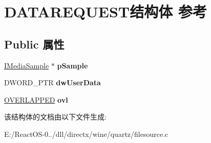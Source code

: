 \hypertarget{struct_d_a_t_a_r_e_q_u_e_s_t}{}\section{D\+A\+T\+A\+R\+E\+Q\+U\+E\+S\+T结构体 参考}
\label{struct_d_a_t_a_r_e_q_u_e_s_t}
\subsection*{Public 属性}
\begin{DoxyCompactItemize}
\item 
\mbox{\label{struct_d_a_t_a_r_e_q_u_e_s_t_ac9af028a17b797e496bcdaf2244c1789}} 
\hyperlink{interface_i_media_sample}{I\+Media\+Sample} $\ast$ {\bfseries p\+Sample}
\item 
\mbox{\label{struct_d_a_t_a_r_e_q_u_e_s_t_abb4e50a3109320747de2970bf762aca4}} 
D\+W\+O\+R\+D\+\_\+\+P\+TR {\bfseries dw\+User\+Data}
\item 
\mbox{\label{struct_d_a_t_a_r_e_q_u_e_s_t_a5653d18bf06a346ef6c92cf818a000d6}} 
\hyperlink{struct___o_v_e_r_l_a_p_p_e_d}{O\+V\+E\+R\+L\+A\+P\+P\+ED} {\bfseries ovl}
\end{DoxyCompactItemize}


该结构体的文档由以下文件生成\+:\begin{DoxyCompactItemize}
\item 
E\+:/\+React\+O\+S-\/0../dll/directx/wine/quartz/filesource.\+c\end{DoxyCompactItemize}
